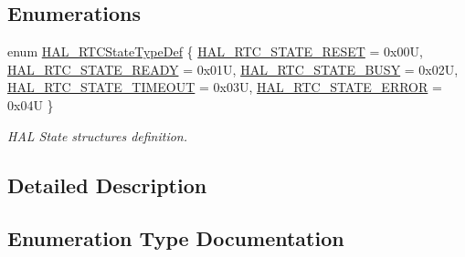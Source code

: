 \subsection*{Enumerations}
\begin{DoxyCompactItemize}
\item 
enum \hyperlink{group___r_t_c___exported___types_ga1e2460a2d13c4efc7a2a1ab2a1ebd32b}{H\+A\+L\+\_\+\+R\+T\+C\+State\+Type\+Def} \{ \newline
\hyperlink{group___r_t_c___exported___types_gga1e2460a2d13c4efc7a2a1ab2a1ebd32ba69cd05758f5129525749b65bee6f939f}{H\+A\+L\+\_\+\+R\+T\+C\+\_\+\+S\+T\+A\+T\+E\+\_\+\+R\+E\+S\+ET} = 0x00U, 
\hyperlink{group___r_t_c___exported___types_gga1e2460a2d13c4efc7a2a1ab2a1ebd32ba466484cd22333d8c8758ae12890b862f}{H\+A\+L\+\_\+\+R\+T\+C\+\_\+\+S\+T\+A\+T\+E\+\_\+\+R\+E\+A\+DY} = 0x01U, 
\hyperlink{group___r_t_c___exported___types_gga1e2460a2d13c4efc7a2a1ab2a1ebd32ba5e0a8c8e4731ac8f80e9a219413d6f9b}{H\+A\+L\+\_\+\+R\+T\+C\+\_\+\+S\+T\+A\+T\+E\+\_\+\+B\+U\+SY} = 0x02U, 
\hyperlink{group___r_t_c___exported___types_gga1e2460a2d13c4efc7a2a1ab2a1ebd32ba062e7947b5f5f0c2acb7be96207e3d58}{H\+A\+L\+\_\+\+R\+T\+C\+\_\+\+S\+T\+A\+T\+E\+\_\+\+T\+I\+M\+E\+O\+UT} = 0x03U, 
\newline
\hyperlink{group___r_t_c___exported___types_gga1e2460a2d13c4efc7a2a1ab2a1ebd32ba21f381f99f437c340f79407e3d71bb31}{H\+A\+L\+\_\+\+R\+T\+C\+\_\+\+S\+T\+A\+T\+E\+\_\+\+E\+R\+R\+OR} = 0x04U
 \}\begin{DoxyCompactList}\small\item\em H\+AL State structures definition. \end{DoxyCompactList}
\end{DoxyCompactItemize}


\subsection{Detailed Description}


\subsection{Enumeration Type Documentation}
\mbox{\label{group___r_t_c___exported___types_ga1e2460a2d13c4efc7a2a1ab2a1ebd32b}} 
